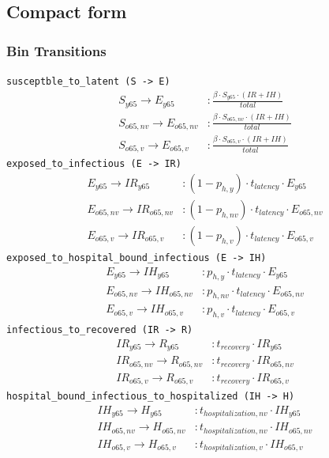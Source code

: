 \documentclass{article}
\begin{document}
\subsection*{Compact form}
\subsubsection*{Bin Transitions}
\noindent\texttt{susceptble\_to\_latent (S -\textgreater{} E)}
\begin{align*}
S_{y65} \to E_{y65} &: \frac{\beta \cdot S_{y65} \cdot (IR + IH)}{total} \\
S_{o65,nv} \to E_{o65,nv} &: \frac{\beta \cdot S_{o65,nv} \cdot (IR + IH)}{total} \\
S_{o65,v} \to E_{o65,v} &: \frac{\beta \cdot S_{o65,v} \cdot (IR + IH)}{total}
\end{align*}
\noindent\texttt{exposed\_to\_infectious (E -\textgreater{} IR)}
\begin{align*}
E_{y65} \to IR_{y65} &: (1 - p_{h,y}) \cdot t_{latency} \cdot E_{y65} \\
E_{o65,nv} \to IR_{o65,nv} &: (1 - p_{h,nv}) \cdot t_{latency} \cdot E_{o65,nv} \\
E_{o65,v} \to IR_{o65,v} &: (1 - p_{h,v}) \cdot t_{latency} \cdot E_{o65,v}
\end{align*}
\noindent\texttt{exposed\_to\_hospital\_bound\_infectious (E -\textgreater{} IH)}
\begin{align*}
E_{y65} \to IH_{y65} &: p_{h,y} \cdot t_{latency} \cdot E_{y65} \\
E_{o65,nv} \to IH_{o65,nv} &: p_{h,nv} \cdot t_{latency} \cdot E_{o65,nv} \\
E_{o65,v} \to IH_{o65,v} &: p_{h,v} \cdot t_{latency} \cdot E_{o65,v}
\end{align*}
\noindent\texttt{infectious\_to\_recovered (IR -\textgreater{} R)}
\begin{align*}
IR_{y65} \to R_{y65} &: t_{recovery} \cdot IR_{y65} \\
IR_{o65,nv} \to R_{o65,nv} &: t_{recovery} \cdot IR_{o65,nv} \\
IR_{o65,v} \to R_{o65,v} &: t_{recovery} \cdot IR_{o65,v}
\end{align*}
\noindent\texttt{hospital\_bound\_infectious\_to\_hospitalized (IH -\textgreater{} H)}
\begin{align*}
IH_{y65} \to H_{y65} &: t_{hospitalization,nv} \cdot IH_{y65} \\
IH_{o65,nv} \to H_{o65,nv} &: t_{hospitalization,nv} \cdot IH_{o65,nv} \\
IH_{o65,v} \to H_{o65,v} &: t_{hospitalization,v} \cdot IH_{o65,v}
\end{align*}
\end{document}
